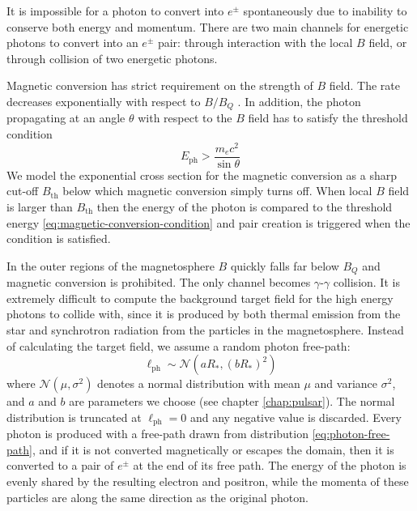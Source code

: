 It is impossible for a photon to convert into $e^{\pm}$ spontaneously due to
inability to conserve both energy and momentum. There are two main channels for
energetic photons to convert into an $e^{\pm}$ pair: through interaction with the
local $B$ field, or through collision of two energetic photons.

Magnetic conversion has strict requirement on the strength of $B$ field. The
rate decreases exponentially with respect to $B/B_{Q}$
\citep{erber_high-energy_1966}. In addition, the photon propagating at an angle
$\theta$ with respect to the $B$ field has to satisfy the threshold condition
\begin{equation}
  \label{eq:magnetic-conversion-condition}
  E_\mathrm{ph} > \frac{m_{e}c^2}{\sin\theta}
\end{equation}
We model the exponential cross section for the magnetic conversion as a sharp
cut-off $B_\mathrm{th}$ below which magnetic conversion simply turns off. When
local $B$ field is larger than $B_\mathrm{th}$ then the energy of the photon is
compared to the threshold energy \eqref{eq:magnetic-conversion-condition} and
pair creation is triggered when the condition is satisfied.

In the outer regions of the magnetosphere $B$ quickly falls far below $B_{Q}$
and magnetic conversion is prohibited. The only channel becomes
$\gamma$-$\gamma$ collision. It is extremely difficult to compute the background
target field for the high energy photons to collide with, since it is produced
by both thermal emission from the star and synchrotron radiation from the
particles in the magnetosphere. Instead of calculating the target field, we
assume a random photon free-path:
\begin{equation}
  \label{eq:photon-free-path}
  \ell_\mathrm{ph} \sim \mathcal{N}(aR_{*}, (bR_{*})^2)
\end{equation}
where $\mathcal{N}(\mu, \sigma^2)$ denotes a normal distribution with mean $\mu$
and variance $\sigma^2$, and $a$ and $b$ are parameters we choose (see chapter
\ref{chap:pulsar}). The normal distribution is truncated at $\ell_\mathrm{ph} =
0$ and any negative value is discarded. Every photon is produced with a
free-path drawn from distribution \ref{eq:photon-free-path}, and if it is not
converted magnetically or escapes the domain, then it is converted to a pair of
$e^{\pm}$ at the end of its free path. The energy of the photon is evenly shared
by the resulting electron and positron, while the momenta of these particles are
along the same direction as the original photon.

